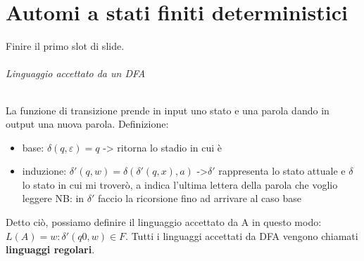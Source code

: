 \chapter{Automi a stati finiti deterministici}
Finire il primo slot di slide.

\subparagraph{Linguaggio accettato da un DFA}
La funzione di transizione prende in input uno stato e una parola dando in output
una nuova parola. Definizione:
\begin{itemize}
\item base: $\delta(q,\varepsilon)=q$ -> ritorna lo stadio in cui è
\item induzione: $\delta'(q,w)=\delta(\delta'(q,x),a)$ ->$\delta'$ 
rappresenta lo stato attuale e $\delta$ lo stato in cui mi troverò,
a indica l'ultima lettera della parola che voglio leggere
NB: in $\delta'$ faccio la ricorsione fino ad arrivare al caso base 
\end{itemize}
Detto ciò, possiamo definire il linguaggio accettato da A in questo modo:
$L(A)={w: \delta'(q0,w) \in F}$. Tutti i linguaggi accettati da DFA vengono
chiamati \textbf{linguaggi regolari}.